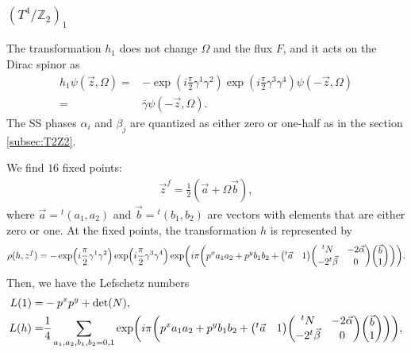 \documentclass[11pt]{article}
\newcommand{\Lef}{Lefschetz }
\begin{document}
\subsubsection{ $(T^4/\mathbb{Z}_2)_1$}
\label{subsec:T4Z2_1}

The transformation $h_1$ does not change $\Omega$ and the flux $F$, and it acts on the Dirac spinor as 
\begin{align}
    h_1 \psi(\vec{z},\Omega)=& -\exp(i \frac{\pi}{2} \gamma^1 \gamma^2 )\exp(i \frac{\pi}{2} \gamma^3 \gamma^4 )\psi(-\vec{z},\Omega) \nonumber \\
   =& \bar{\gamma} \psi(-\vec{z},\Omega) .
\end{align} 
The SS phases $\alpha_i$ and $\beta_j$ are quantized as either zero or one-half as in the section \ref{subsec:T2Z2}.


We find $16$ fixed points:
\begin{align}
    \vec{z}^f= \frac{1}{2}(\vec{a}+\Omega \vec{b}),
\end{align}
where $\vec{a}={}^t (a_1,a_2)$ and $ \vec{b}={}^t (b_1,b_2)$ are vectors with elements that are either zero or one. At the fixed points, the transformation $h$ is represented by
\begin{align}
\rho(h,z^f)=-\exp(i \frac{\pi}{2} \gamma^1 \gamma^2 )\exp(i \frac{\pi}{2} \gamma^3 \gamma^4 )\exp( i\pi \qty( p^x a_1 a_2+p^y b_1 b_2 + \mqty({}^t\vec{a} & 1) \mqty( {}^tN & -2\vec{\alpha} \\-2 {}^t\vec{\beta} & 0) \mqty(\vec{b} \\ 1) )).
\end{align}
Then, we have the \Lef numbers
\begin{align}
    L(1)=&-p^x p^y + \det(N), \\
    L(h)=& \frac{1}{4}\sum_{a_1,a_2,b_1,b_2=0,1} \exp( i\pi \qty( p^x a_1 a_2+p^y b_1 b_2 + \mqty({}^t\vec{a} & 1) \mqty( {}^tN & -2\vec{\alpha} \\-2 {}^t\vec{\beta} & 0) \mqty(\vec{b} \\ 1) )),
\end{align}
\end{document}
